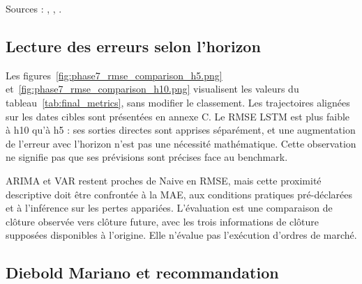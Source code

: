 Sources : , , .





\subsection{Lecture des erreurs selon l’horizon}









Les figures~\ref{fig:phase7_rmse_comparison_h5.png} et~\ref{fig:phase7_rmse_comparison_h10.png} visualisent les valeurs du tableau~\ref{tab:final_metrics}, sans modifier le classement. Les trajectoires alignées sur les dates cibles sont présentées en annexe C. Le RMSE LSTM est plus faible à h10 qu’à h5 : ses sorties directes sont apprises séparément, et une augmentation de l’erreur avec l’horizon n’est pas une nécessité mathématique. Cette observation ne signifie pas que ses prévisions sont précises face au benchmark.



ARIMA et VAR restent proches de Naive en RMSE, mais cette proximité descriptive doit être confrontée à la MAE, aux conditions pratiques pré-déclarées et à l’inférence sur les pertes appariées. L’évaluation est une comparaison de clôture observée vers clôture future, avec les trois informations de clôture supposées disponibles à l’origine. Elle n’évalue pas l’exécution d’ordres de marché.





\subsection{Diebold Mariano et recommandation}



